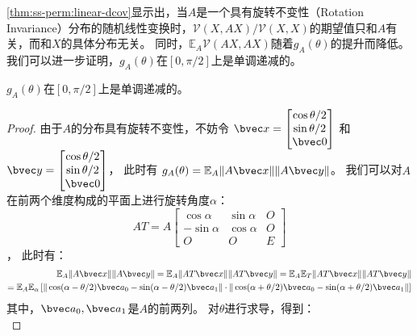 \autoref{thm:ss-perm:linear-dcov}显示出，当$A$是一个具有旋转不变性（Rotation Invariance）分布的随机线性变换时，$\mathcal{V}(X, AX)/\mathcal{V}(X, X)$的期望值只和$A$有关，而和$X$的具体分布无关。
%
同时，$\mathbb E_A \mathcal{V}(AX, AX)$随着$g_A(\theta)$的提升而降低。
%
我们可以进一步证明，$g_A(\theta)$在$[0, \pi/2]$上是单调递减的。
%
\begin{proposition}
    $g_A(\theta)$在$[0, \pi/2]$上是单调递减的。
\end{proposition}
%
\begin{proof}
    由于$A$的分布具有旋转不变性，不妨令
    $\bvec x = \begin{bmatrix}
        \cos \theta/2 \\ \sin \theta/2 \\ \bvec 0   
    \end{bmatrix}$
    和
    $\bvec y = \begin{bmatrix}
        \cos \theta/2 \\ \sin \theta/2 \\ \bvec 0
    \end{bmatrix}$，
    此时有 $g_A(\theta) = \mathbb E_A \Vert A\bvec x\Vert \Vert A \bvec y\Vert$。
    我们可以对$A$在前两个维度构成的平面上进行旋转角度$\alpha$：
    \begin{equation}
        AT = A \begin{bmatrix}
            \cos \alpha & \sin \alpha & O \\
            -\sin \alpha &\cos \alpha & O \\
            O & O & E
        \end{bmatrix}
    \end{equation}，
    此时有：
    \begin{equation}
    \begin{split}
        \mathbb E_A \Vert A\bvec x \Vert \Vert A \bvec y \Vert = \mathbb E_A \Vert AT \bvec x \Vert \Vert AT \bvec y \Vert = \mathbb E_A \mathbb E_T \Vert AT \bvec x \Vert \Vert AT \bvec y \Vert \\
        = \mathbb E_A \mathbb E_\alpha 
        \left[
        \Vert \cos(\alpha - \theta/2)\bvec a_0 - \sin (\alpha - \theta/2) \bvec a_1\Vert 
        \cdot
        \Vert \cos(\alpha + \theta/2)\bvec a_0 - \sin (\alpha + \theta/2) \bvec a_1\Vert
        \right]
    \end{split}   
    \end{equation}
    其中，$\bvec a_0, \bvec a_1$是$A$的前两列。
    对$\theta$进行求导，得到：
    \begin{equation}

\end{equation}
\end{proof}
